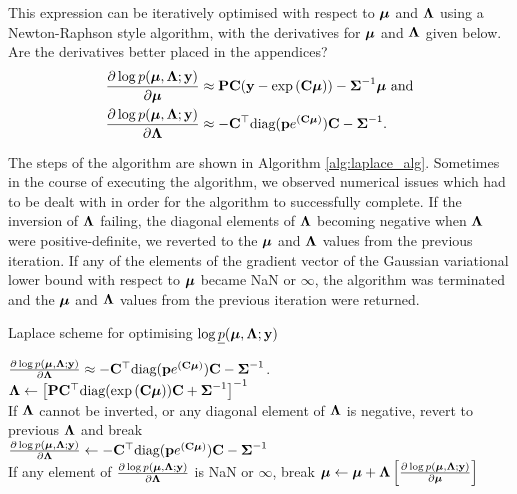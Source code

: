 \documentclass{amsart}[12pt]
\newcommand{\mgc}[1]{{\color{blue}#1}}
\begin{document}
			\noindent This expression can be iteratively optimised with respect to ${\boldsymbol \mu}$ and ${\boldsymbol \Lambda}$ using a Newton-Raphson style algorithm, with the derivatives for ${\boldsymbol \mu}$ and ${\boldsymbol \Lambda}$ given below.
			\mgc{Are the derivatives better placed in the appendices?}
			\begin{align*}
				\frac{\partial \log p({\boldsymbol \mu}, {\boldsymbol \Lambda}; {\bf y})}{\partial {\boldsymbol\mu}}     & \approx {\bf P} {\bf C} ({\bf y} - \exp{({\bf C}{\boldsymbol\mu})}) - {\boldsymbol \Sigma}^{-1} {\boldsymbol \mu} \text{ and} \\
				\frac{\partial \log p({\boldsymbol \mu}, {\boldsymbol \Lambda}; {\bf y})}{\partial {\boldsymbol\Lambda}} & \approx - {\bf C}^\top \text{diag}({\bf p} e^{({\bf C} {\boldsymbol \mu})}) {\bf C} - {\boldsymbol \Sigma}^{-1}.   
			\end{align*}
					
			\noindent The steps of the algorithm are shown in Algorithm \ref{alg:laplace_alg}. Sometimes in the course of	executing the algorithm, we observed numerical issues which had to be dealt with in order for the
			algorithm to successfully complete. If the inversion  of ${\boldsymbol \Lambda}$ failing, the diagonal elements of
			${\boldsymbol \Lambda}$ becoming negative when ${\boldsymbol \Lambda}$ were positive-definite, we reverted to the ${\boldsymbol \mu}$ and
			${\boldsymbol \Lambda}$ values from the previous iteration. If any of the elements of the gradient vector of the
			Gaussian variational lower bound with respect to ${\boldsymbol \mu}$ became NaN or $\infty$, the algorithm was
			terminated and the ${\boldsymbol \mu}$ and ${\boldsymbol \Lambda}$ values from the previous iteration were returned.
					
			\begin{algorithm}
				\caption{Laplace scheme for optimising $\log \underline{p}({\boldsymbol \mu}, {\boldsymbol \Lambda}; {\bf y})$}
				\label{alg:laplace_alg}
				\begin{algorithmic}
					\REQUIRE $\frac{\partial \log p({\boldsymbol \mu}, {\boldsymbol \Lambda}; {\bf y})}{\partial {\boldsymbol\Lambda}} \approx - {\bf C}^\top \text{diag}({\bf p} e^{({\bf C} {\boldsymbol \mu})}) {\bf C} - {\boldsymbol \Sigma}^{-1}$.
					\STATE ${\boldsymbol \Lambda} \leftarrow \left [{\bf P} {\bf C}^\top \text{diag}(\exp{({\bf C}{\boldsymbol\mu})}) {\bf C} + {\boldsymbol \Sigma}^{-1} \right ]^{-1}$ \\ [1ex] 
					If ${\boldsymbol \Lambda}$ cannot be inverted, or any diagonal element of ${\boldsymbol \Lambda}$ is negative, revert to previous
					${\boldsymbol \Lambda}$ and break \\ [1ex]
					\STATE $\frac{\partial \log p({\boldsymbol \mu}, {\boldsymbol \Lambda}; {\bf y})}{\partial {\boldsymbol\Lambda}}
					\leftarrow - {\bf C}^\top \text{diag}({\bf p} e^{({\bf C} {\boldsymbol \mu})}) {\bf C} - {\boldsymbol \Sigma}^{-1}$ \\ [1ex]
					If any element of $\frac{\partial \log p({\boldsymbol \mu}, {\boldsymbol \Lambda}; {\bf y})}{\partial {\boldsymbol\Lambda}}$ is NaN or $\infty$,
					break
					\STATE ${\boldsymbol \mu} \leftarrow {\boldsymbol\mu} + {\boldsymbol \Lambda} \left [ \frac{\partial \log p({\boldsymbol \mu}, {\boldsymbol \Lambda}; {\bf y})}{\partial {\boldsymbol\mu}} \right ]$ \\ [1ex]
					\ENDWHILE
				\end{algorithmic}
			\end{algorithm}
					
\end{document}
